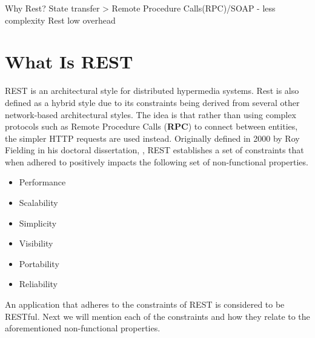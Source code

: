 
Why Rest? State transfer > Remote Procedure Calls(RPC)/SOAP - less complexity
Rest low overhead

\section{What Is REST}
REST is an architectural style for distributed hypermedia systems.
Rest is also defined as a hybrid style due to its constraints being derived from several other network-based architectural styles.
The idea is that rather than using complex protocols such as Remote Procedure Calls (\textbf{RPC}) to connect between entities, the simpler HTTP requests are used instead.
Originally defined in 2000 by Roy Fielding in his doctoral dissertation, \citep{fielding2000rest}, REST establishes a set of constraints that when adhered to positively impacts the following set of non-functional properties.
\begin{itemize}
    \item Performance
    \item Scalability
    \item Simplicity
    \item Visibility
    \item Portability
    \item Reliability
\end{itemize}
An application that adheres to the constraints of REST is considered to be RESTful.
Next we will mention each of the constraints and how they relate to the aforementioned non-functional properties.

